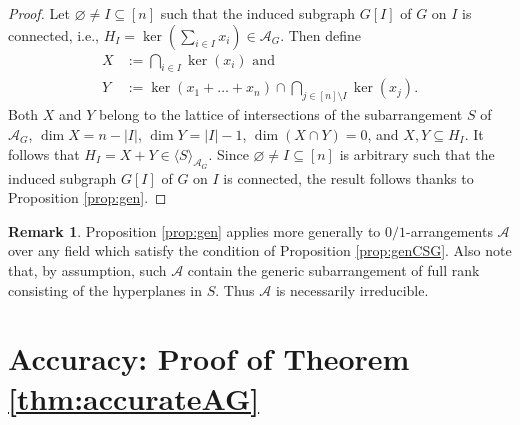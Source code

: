\documentclass[12pt]{amsart}
\newcommand\CA{{\mathscr A}}
\numberwithin{equation}{section}
\theoremstyle{plain}
\theoremstyle{definition}
\newtheorem{remark}[equation]{Remark}
\begin{document}
\begin{proof}
	Let $\varnothing \ne I \subseteq [n]$ such that the induced subgraph $G[I]$ of $G$ on $I$ is connected, i.e., $H_I = \ker(\sum_{i\in I}x_i) \in \CA_G$.
	Then define
	\begin{align*}
	X & := \bigcap_{i \in I}\ker(x_i) \text{ and } \\
	Y & := \ker(x_1 + \ldots + x_n) \cap \bigcap_{j \in [n]\setminus I}\ker(x_j).
\end{align*}
Both $X$ and $Y$ belong to the lattice of intersections of the subarrangement $S$ of $\CA_G$, $\dim X = n - |I|$, $\dim Y = |I|-1$, $\dim (X \cap Y) = 0$, and $X, Y \subseteq H_I$.
It follows that $H_I = X + Y \in \langle S \rangle_{\CA_G}$. Since $\varnothing \ne I \subseteq [n]$ is arbitrary such that the induced subgraph $G[I]$ of $G$ on $I$ is connected, the result follows thanks to Proposition \ref{prop:gen}.
\end{proof}

\begin{remark}
	\label{rem:gen}
	Proposition \ref{prop:gen} applies more generally to $0/1$-arrangements $\CA$ over any field 
	which satisfy the condition of Proposition \ref{prop:genCSG}. Also note that, by assumption, 
	such $\CA$ contain the generic subarrangement of full rank consisting of the hyperplanes in $S$.
	Thus $\CA$ is necessarily irreducible.
\end{remark}


\section{Accuracy: Proof of Theorem \ref{thm:accurateAG}}
\label{s:accurateAG}
\end{document}
